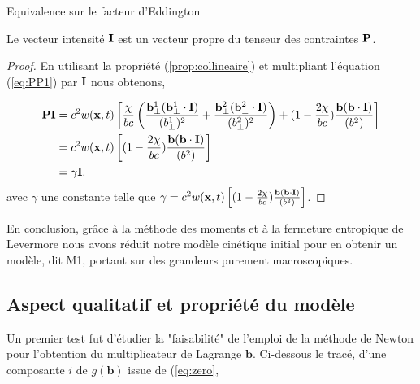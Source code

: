 \begin{remark}Equivalence sur le facteur d'Eddington
\end{remark}

\begin{proposition}
Le vecteur intensité $\mathbf{I}$ est un vecteur propre du tenseur des contraintes $\mathbf{P}$.
\end{proposition}


\begin{proof}
En utilisant la propriété (\ref{prop:collineaire}) et multipliant l'équation (\ref{eq:PP1}) par $\mathbf{I}$ nous obtenons, 

\begin{equation}
\begin{aligned}
\mathbf{P}\mathbf{I} &= c^2 w(\mathbf{x},t)  \left[  \frac{\chi}{bc}  \left( 
  \frac{\mathbf{b}_{\perp}^1 (\mathbf{b}_{\perp}^1 \cdot \mathbf{I})}{ (b_{\perp}^1)^2} 
  +\frac{\mathbf{b}_{\perp}^2 (\mathbf{b}_{\perp}^2 \cdot \mathbf{I}) }{ (b_{\perp}^2)^2}\right)
  + ( 1 - \frac{2\chi}{bc} ) \frac{\mathbf{b} (\mathbf{b} \cdot \mathbf{I})}{ (b^2)} \right] \\
  &=  c^2 w(\mathbf{x},t)  \left[( 1 - \frac{2\chi}{bc} ) \frac{\mathbf{b} (\mathbf{b} \cdot \mathbf{I})}{(b^2)}
  \right] \\
  &=\gamma\mathbf{I}.
\end{aligned}
\end{equation}
 avec $\gamma$ une constante telle que $\gamma = c^2 w(\mathbf{x},t) \left[( 1 - \frac{2\chi}{bc} ) \frac{\mathbf{b} (\mathbf{b} \cdot \mathbf{I})}{(b^2)} \right]$.
\end{proof}


En conclusion, grâce à la méthode des moments et à la fermeture entropique de Levermore nous avons réduit notre modèle cinétique initial pour en obtenir un modèle, dit M1, portant sur des grandeurs purement macroscopiques. 

\subsection{Aspect qualitatif et propriété du modèle}

Un premier test fut d'étudier la "faisabilité"  de l'emploi de la méthode de Newton pour l'obtention du multiplicateur de Lagrange $\mathbf{b}$. Ci-dessous le tracé,  d'une composante $i$ de $g(\mathbf{b})$ issue de (\ref{eq:zero}, 

\begin{center}
\hspace{4cm}
\end{center}



